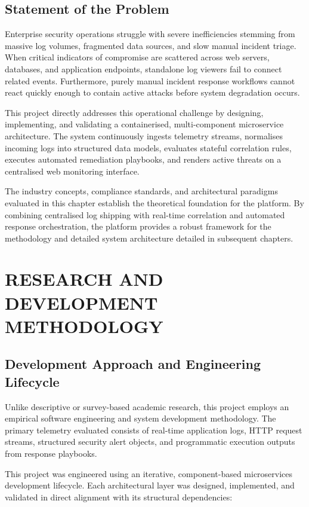 \section{Statement of the Problem}

Enterprise security operations struggle with severe inefficiencies stemming from massive log volumes, fragmented data sources, and slow manual incident triage. When critical indicators of compromise are scattered across web servers, databases, and application endpoints, standalone log viewers fail to connect related events. Furthermore, purely manual incident response workflows cannot react quickly enough to contain active attacks before system degradation occurs.

This project directly addresses this operational challenge by designing, implementing, and validating a containerised, multi-component microservice architecture. The system continuously ingests telemetry streams, normalises incoming logs into structured data models, evaluates stateful correlation rules, executes automated remediation playbooks, and renders active threats on a centralised web monitoring interface.

The industry concepts, compliance standards, and architectural paradigms evaluated in this chapter establish the theoretical foundation for the platform. By combining centralised log shipping with real-time correlation and automated response orchestration, the platform provides a robust framework for the methodology and detailed system architecture detailed in subsequent chapters.

\newpage
\chapter{RESEARCH AND DEVELOPMENT METHODOLOGY}

\section{Development Approach and Engineering Lifecycle}

Unlike descriptive or survey-based academic research, this project employs an empirical software engineering and system development methodology. The primary telemetry evaluated consists of real-time application logs, HTTP request streams, structured security alert objects, and programmatic execution outputs from response playbooks.

This project was engineered using an iterative, component-based microservices development lifecycle. Each architectural layer was designed, implemented, and validated in direct alignment with its structural dependencies:


